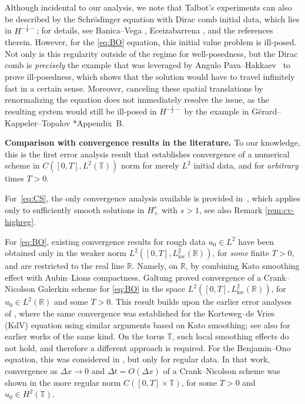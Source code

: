 \documentclass [11pt] {article}
\newcommand{\<}{\langle}
\renewcommand{\>}{\rangle}
\begin{document}
Although incidental to our analysis, we note that Talbot's experiments can also be described by the Schr\"odinger equation with Dirac comb initial data, which lies in $H^{-\frac12 -}$; for details, see Banica--Vega \cite{banica2020evolution}, Eceizabarrena \cite{eceizabarrena2021talbot}, and the references therein.  However, for the \eqref{eq:BO} equation, this initial value problem is ill-posed.  Not only is this regularity outside of the regime for well-posedness, but the Dirac comb is \emph{precisely} the example that was leveraged by  Angulo Pava--Hakkaev~\cite{APH} to prove ill-posedness, which shows that the solution would have to travel infinitely fast in a certain sense.  Moreover, canceling these spatial translations by renormalizing the equation does not immediately resolve the issue, as the resulting system would still be ill-posed in $H^{-\frac12 -}$ by the example in Gérard--Kappeler--Topalov \cite{Gerard23WP}*{Appendix~B}.
\newline




%
\noindent
{\bf Comparison with convergence results in the literature.}
To our knowledge, this is the first error analysis result that establishes convergence of a numerical scheme in \( C([0,T], L^2(\mathbb{T})) \) norm for merely \(L^2\) initial data, and for {\it arbitrary} times \(T>0\). 

For~\eqref{eq:CS},  the only convergence analysis available is provided in~\cite{ABCD24}, which applies only to sufficiently smooth solutions in $H^s_+$ with $s>1$, see also Remark \ref{rem:cv-highreg}. 

For \eqref{eq:BO}, existing convergence results for rough data \(u_0 \in L^2\) have been obtained only in the weaker norm \( L^2([0,T], L^2_{\mathrm{loc}}(\mathbb{R})) \), for {\it some} finite \(T>0\), and are restricted to the real line \( \mathbb{R} \).
Namely, on \( \mathbb{R} \), by combining Kato smoothing effect with Aubin--Lions compactness, Galtung \cite{galtung-18} proved convergence of a Crank--Nicolson Galerkin scheme for \eqref{eq:BO}  in the space \( L^2([0,T], L^2_{\mathrm{loc}}(\mathbb{R})) \), for \(u_0 \in L^2(\mathbb{R})\)  and some \(T>0\). This result builds upon the earlier error analyses of \cite{dutta2016note, dutta2015convergence}, where the same convergence was established for the Korteweg--de Vries (KdV) equation using similar arguments based on Kato smoothing; see also \cite{amorim2013convergence, holden2015convergence} for earlier works of the same kind.
%
On the torus \( \mathbb{T} \), such local smoothing effects do not hold, and therefore a different approach is required. For the Benjamin--Ono equation, this was considered in \cite{dutta-16}, but only for regular data. In that work, convergence as \( \Delta x \to 0\) and \( \Delta t = O(\Delta x)\) of a Crank--Nicolson scheme was shown in the more regular norm \( C([0,T] \times \mathbb{T}) \), for some \(T>0\) and \(u_0 \in H^2(\mathbb{T})\).
%
\end{document}

